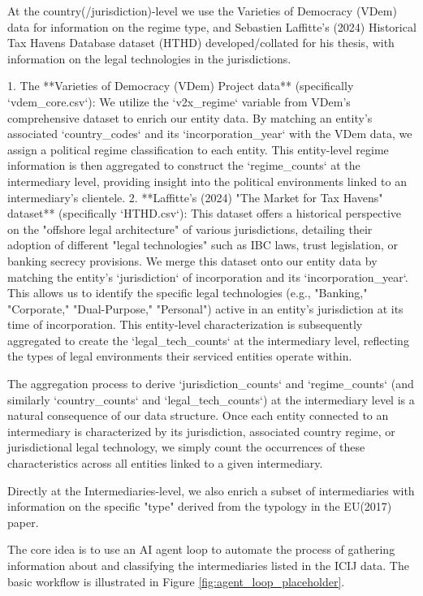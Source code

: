 At the country(/jurisdiction)-level we use the Varieties of Democracy (VDem) data for information on the regime type, and Sebastien Laffitte's (2024) Historical Tax Havens Database dataset (HTHD) developed/collated for his thesis, with information on the legal technologies in the jurisdictions. 

1.  The **Varieties of Democracy (VDem) Project data** (specifically `vdem_core.csv`): We utilize the `v2x_regime` variable from VDem's comprehensive dataset to enrich our entity data. By matching an entity's associated `country_codes` and its `incorporation_year` with the VDem data, we assign a political regime classification to each entity. This entity-level regime information is then aggregated to construct the `regime_counts` at the intermediary level, providing insight into the political environments linked to an intermediary's clientele.
2.  **Laffitte's (2024) "The Market for Tax Havens" dataset** (specifically `HTHD.csv`): This dataset offers a historical perspective on the "offshore legal architecture" of various jurisdictions, detailing their adoption of different "legal technologies" such as IBC laws, trust legislation, or banking secrecy provisions. We merge this dataset onto our entity data by matching the entity's `jurisdiction` of incorporation and its `incorporation_year`. This allows us to identify the specific legal technologies (e.g., "Banking," "Corporate," "Dual-Purpose," "Personal") active in an entity's jurisdiction at its time of incorporation. This entity-level characterization is subsequently aggregated to create the `legal_tech_counts` at the intermediary level, reflecting the types of legal environments their serviced entities operate within.

The aggregation process to derive `jurisdiction_counts` and `regime_counts` (and similarly `country_counts` and `legal_tech_counts`) at the intermediary level is a natural consequence of our data structure. Once each entity connected to an intermediary is characterized by its jurisdiction, associated country regime, or jurisdictional legal technology, we simply count the occurrences of these characteristics across all entities linked to a given intermediary.

Directly at the Intermediaries-level, we also enrich a subset of intermediaries with information on the specific "type" derived from the typology in the EU(2017) paper. 

The core idea is to use an AI agent loop to automate the process of gathering information about and classifying the intermediaries listed in the ICIJ data. The basic workflow is illustrated in Figure \ref{fig:agent_loop_placeholder}.


